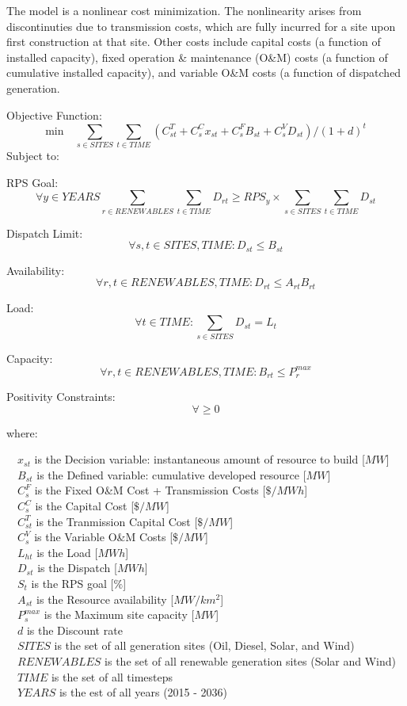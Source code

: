 \documentclass[12pt,letterpaper,fleqn]{report}
\begin{document}
The model is a nonlinear cost minimization. The nonlinearity arises
from discontinuties due to transmission costs, which are fully
incurred for a site upon first construction at that site. Other costs
include capital costs (a function of installed capacity), fixed
operation \& maintenance (O\&M) costs (a function of cumulative
installed capacity), and variable O\&M costs (a function of dispatched
generation. 

Objective Function:
  \[\text{min} \quad  \sum_{s \in SITES}\sum_{t \in TIME}(C_{st}^T + C_s^Cx_{st}
  + C_s^FB_{st} + C_s^VD_{st}) / (1 + d)^t\]
  Subject to:

  RPS Goal:
  \[\forall y \in YEARS \sum_{r \in RENEWABLES}\sum_{t \in TIME} D_{rt} \ge RPS_y \times
  \sum_{s \in SITES}\sum_{t \in TIME} D_{st}\]

  Dispatch Limit:
  \[\forall s,t \in SITES, TIME: D_{st} \le B_{st}\]

  Availability:
  \[\forall r,t \in RENEWABLES, TIME: D_{rt} \le A_{rt}B_{rt}\]

  Load:
  \[\forall t \in TIME: \sum_{s \in SITES} D_{st} = L_{t}\]

  Capacity:
  \[\forall r,t \in RENEWABLES, TIME: B_{rt} \le P_r^{max}\]

  Positivity Constraints:
  \[\forall  \ge 0\]
  
  where:

  {\setlength{\parindent}{-1em}
    $\quad x_{st}^{}$ is the Decision variable: instantaneous amount of resource to build [$MW$]\\
    $\quad B_{st}^{}$ is the Defined variable: cumulative developed resource [$MW$]\\
    $\quad C_{s}^{F}$ is the Fixed O\&M Cost + Transmission Costs [$\$/MWh$]\\
    $\quad C_{s}^{C}$ is the Capital Cost [$\$/MW$]\\
    $\quad C_{st}^{T}$ is the Tranmission Capital Cost [$\$/MW$]\\
    $\quad C_{s}^{V}$ is the Variable O\&M Costs [$\$/MW$]\\
    $\quad L_{ht}^{}$ is the Load [$MWh$]\\
    $\quad D_{st}^{}$ is the Dispatch [$MWh$]\\
    $\quad S_{t}^{}$ is the RPS goal [$\%$]\\
    $\quad A_{st}^{}$ is the Resource availability [$MW/km^2$]\\
    $\quad P_{s}^{max}$ is the Maximum site capacity [$MW$]\\
    $\quad d$ is the Discount rate\\
    $\quad SITES$ is the set of all generation sites (Oil, Diesel,
    Solar, and Wind)\\
    $\quad RENEWABLES$ is the set of all renewable generation sites
    (Solar and Wind)\\
    $\quad TIME$ is the set of all timesteps\\
    $\quad YEARS$ is the est of all years (2015 - 2036)
  }
\end{document}
